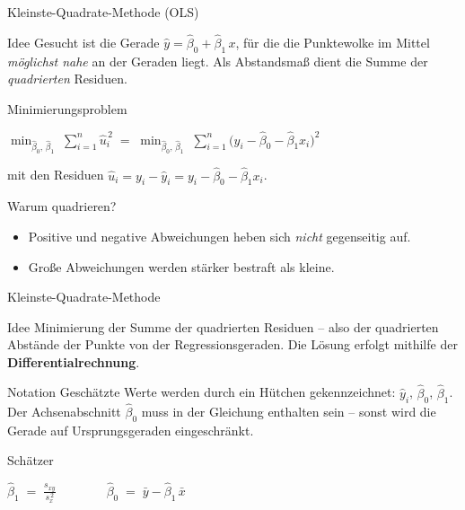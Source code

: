 \documentclass[aspectratio=169,11pt]{beamer}
\begin{document}

\begin{frame}{Kleinste-Quadrate-Methode (OLS)}
  \begin{block}{Idee}
    Gesucht ist die Gerade $\hat{y} = \hat{\beta}_0 + \hat{\beta}_1\,x$,
    für die die Punktewolke im Mittel \emph{möglichst nahe} an der
    Geraden liegt. Als Abstandsmaß dient die Summe der
    \emph{quadrierten} Residuen.
  \end{block}

  \begin{block}{Minimierungsproblem}
    \begin{center}
      $\displaystyle
        \min_{\hat{\beta}_0,\,\hat{\beta}_1}
        \;\sum_{i=1}^{n} \hat{u}_i^{\,2}
        \;=\;
        \min_{\hat{\beta}_0,\,\hat{\beta}_1}
        \;\sum_{i=1}^{n}
        \bigl(y_i - \hat{\beta}_0 - \hat{\beta}_1 x_i\bigr)^{2}
      $
    \end{center}
    mit den Residuen
    $\hat{u}_i = y_i - \hat{y}_i = y_i - \hat{\beta}_0 - \hat{\beta}_1 x_i$.
  \end{block}

  \begin{exampleblock}{Warum quadrieren?}
    \begin{itemize}
      \item Positive und negative Abweichungen heben sich \emph{nicht} gegenseitig auf.
      \item Große Abweichungen werden stärker bestraft als kleine.
    \end{itemize}
  \end{exampleblock}
\end{frame}

\begin{frame}{Kleinste-Quadrate-Methode}
  \begin{block}{Idee}
    Minimierung der Summe der quadrierten Residuen -- also der
    quadrierten Abstände der Punkte von der Regressionsgeraden.
    Die Lösung erfolgt mithilfe der \textbf{Differentialrechnung}.
  \end{block}

  \begin{block}{Notation}
    Geschätzte Werte werden durch ein \glqq Hütchen\grqq{} gekennzeichnet:
    $\hat{y}_i$, $\hat{\beta}_0$, $\hat{\beta}_1$. Der Achsenabschnitt
    $\hat{\beta}_0$ muss in der Gleichung enthalten sein -- sonst wird
    die Gerade auf Ursprungsgeraden eingeschränkt.
  \end{block}

  \begin{block}{Schätzer}
    \begin{center}
      $\displaystyle
        \hat{\beta}_1 \;=\; \frac{s_{xy}}{s_x^{\,2}}
        \qquad\qquad
        \hat{\beta}_0 \;=\; \bar{y} - \hat{\beta}_1\,\bar{x}
      $
    \end{center}
  \end{block}
\end{frame} 
\end{document}
